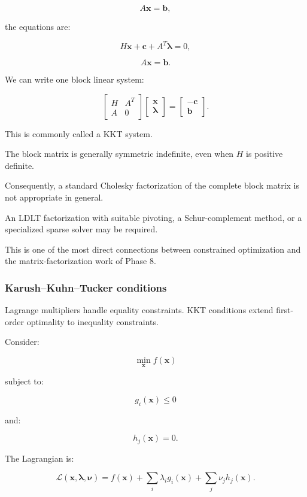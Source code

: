 \[
A\mathbf x=\mathbf b,
\]

the equations are:

\[
H\mathbf x+\mathbf c+A^T\boldsymbol\lambda=0,
\]

\[
A\mathbf x=\mathbf b.
\]

We can write one block linear system:

\[
\boxed{ \begin{bmatrix} H&A^T\\ A&0 \end{bmatrix} \begin{bmatrix} \mathbf x\\ \boldsymbol\lambda \end{bmatrix} = \begin{bmatrix} -\mathbf c\\ \mathbf b \end{bmatrix} }.
\]

This is commonly called a KKT system.

The block matrix is generally symmetric indefinite, even when \(H\) is positive definite.

Consequently, a standard Cholesky factorization of the complete block matrix is not appropriate in general.

An LDLT factorization with suitable pivoting, a Schur-complement method, or a specialized sparse solver may be required.

This is one of the most direct connections between constrained optimization and the matrix-factorization work of Phase 8.

\subsubsection{Karush--Kuhn--Tucker conditions}\label{02-foundations-ii-ch026-karushkuhntucker-conditions}

Lagrange multipliers handle equality constraints. KKT conditions extend first-order optimality to inequality constraints.

Consider:

\[
\min_{\mathbf x}f(\mathbf x)
\]

subject to:

\[
g_i(\mathbf x)\le0
\]

and:

\[
h_j(\mathbf x)=0.
\]

The Lagrangian is:

\[
\mathcal L(\mathbf x,\boldsymbol\lambda,\boldsymbol\nu) = f(\mathbf x)+ \sum_i\lambda_i g_i(\mathbf x)+ \sum_j\nu_jh_j(\mathbf x).
\]

